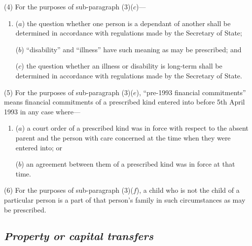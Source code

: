 \documentclass[12pt,a4paper]{article}
\begin{document}
(4) For the purposes of sub-paragraph (3)($c$)—
\begin{enumerate}\item[]
($a$) the question whether one person is a dependant of another shall be determined in accordance with regulations made by the Secretary of State;

($b$) “disability” and “illness” have such meaning as may be prescribed; and

($c$) the question whether an illness or disability is long-term shall be determined in accordance with regulations made by the Secretary of State.
\end{enumerate}

(5) For the purposes of sub-paragraph (3)($e$), “pre-1993 financial commitments” means financial commitments of a prescribed kind entered into before 5th April 1993 in any case where—
\begin{enumerate}\item[]
($a$) a court order of a prescribed kind was in force with respect to the absent parent and the person with care concerned at the time when they were entered into; or

($b$) an agreement between them of a prescribed kind was in force at that time.
\end{enumerate}

(6) For the purposes of sub-paragraph (3)($f$), a child who is not the child of a particular person is a part of that person’s family in such circumstances as may be prescribed.

\subsection*{\itshape Property or capital transfers}
\end{document}
